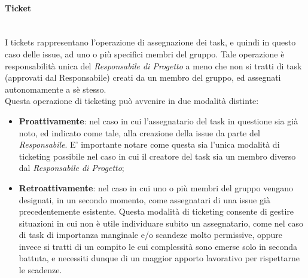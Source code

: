 \paragraph{Ticket} ~\\
	I tickets rappresentano l'operazione di assegnazione dei task, e quindi in questo caso delle issue, ad uno o più specifici membri del gruppo. Tale operazione è responsabilità unica del \textit{Responsabile di Progetto} a meno che non si tratti di task (approvati dal Responsabile) creati da un membro del gruppo, ed assegnati autonomamente a sè stesso.\\
	Questa operazione di ticketing può avvenire in due modalità distinte:
	\begin{itemize}
	\item \textbf{Proattivamente}: nel caso in cui l'assegnatario del task in questione sia già noto, ed indicato come tale, alla creazione della issue da parte del \textit{Responsabile}. E' importante notare come questa sia l'unica modalità di ticketing possibile nel caso in cui il creatore del task sia un membro diverso dal \textit{Responsabile di Progetto};
	\item \textbf{Retroattivamente}: nel caso in cui uno o più membri del gruppo vengano designati, in un secondo momento, come assegnatari di una issue già precedentemente esistente. Questa modalità di ticketing consente di gestire situazioni in cui non è utile individuare subito un assegnatario, come nel caso di task di importanza manginale e/o scandeze molto permissive, oppure invece si tratti di un compito le cui complessità sono emerse solo in seconda battuta, e necessiti dunque di un maggior apporto lavorativo per rispettarne le scadenze.
	\end{itemize}
